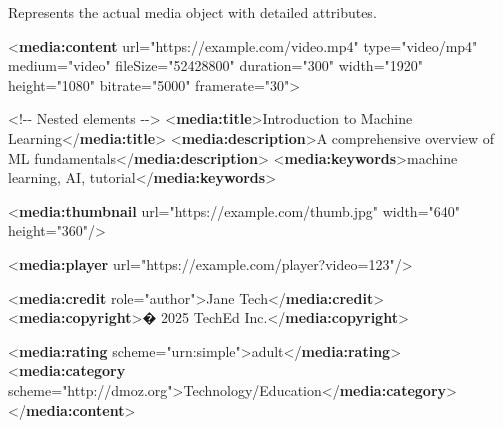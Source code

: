 \documentclass[
  letterpaper,
  DIV=11,
  numbers=noendperiod]{scrartcl}
\newenvironment{Shaded}{\begin{snugshade}}{\end{snugshade}}
\newcommand{\CommentTok}[1]{\textcolor[rgb]{0.37,0.37,0.37}{#1}}
\newcommand{\KeywordTok}[1]{\textcolor[rgb]{0.00,0.23,0.31}{\textbf{#1}}}
\newcommand{\NormalTok}[1]{\textcolor[rgb]{0.00,0.23,0.31}{#1}}
\newcommand{\OtherTok}[1]{\textcolor[rgb]{0.00,0.23,0.31}{#1}}
\newcommand{\StringTok}[1]{\textcolor[rgb]{0.13,0.47,0.30}{#1}}
\begin{document}
Represents the actual media object with detailed attributes.

\begin{Shaded}
\begin{Highlighting}[]
\NormalTok{\textless{}}\KeywordTok{media:content} 
\OtherTok{    url=}\StringTok{"https://example.com/video.mp4"}
\OtherTok{    type=}\StringTok{"video/mp4"}
\OtherTok{    medium=}\StringTok{"video"}
\OtherTok{    fileSize=}\StringTok{"52428800"}
\OtherTok{    duration=}\StringTok{"300"}
\OtherTok{    width=}\StringTok{"1920"}
\OtherTok{    height=}\StringTok{"1080"}
\OtherTok{    bitrate=}\StringTok{"5000"}
\OtherTok{framerate=}\StringTok{"30"}\NormalTok{\textgreater{}}
  
  \CommentTok{\textless{}!{-}{-} Nested elements {-}{-}\textgreater{}}
\NormalTok{  \textless{}}\KeywordTok{media:title}\NormalTok{\textgreater{}Introduction to Machine Learning\textless{}/}\KeywordTok{media:title}\NormalTok{\textgreater{}}
\NormalTok{  \textless{}}\KeywordTok{media:description}\NormalTok{\textgreater{}A comprehensive overview of ML fundamentals\textless{}/}\KeywordTok{media:description}\NormalTok{\textgreater{}}
\NormalTok{  \textless{}}\KeywordTok{media:keywords}\NormalTok{\textgreater{}machine learning, AI, tutorial\textless{}/}\KeywordTok{media:keywords}\NormalTok{\textgreater{}}
  
\NormalTok{  \textless{}}\KeywordTok{media:thumbnail} 
\OtherTok{  url=}\StringTok{"https://example.com/thumb.jpg"} 
\OtherTok{      width=}\StringTok{"640"} 
\OtherTok{      height=}\StringTok{"360"}\NormalTok{/\textgreater{}}
  
\NormalTok{  \textless{}}\KeywordTok{media:player}\OtherTok{ url=}\StringTok{"https://example.com/player?video=123"}\NormalTok{/\textgreater{}}
  
\NormalTok{  \textless{}}\KeywordTok{media:credit}\OtherTok{ role=}\StringTok{"author"}\NormalTok{\textgreater{}Jane Tech\textless{}/}\KeywordTok{media:credit}\NormalTok{\textgreater{}}
\NormalTok{  \textless{}}\KeywordTok{media:copyright}\NormalTok{\textgreater{}� 2025 TechEd Inc.\textless{}/}\KeywordTok{media:copyright}\NormalTok{\textgreater{}}
  
\NormalTok{  \textless{}}\KeywordTok{media:rating}\OtherTok{ scheme=}\StringTok{"urn:simple"}\NormalTok{\textgreater{}adult\textless{}/}\KeywordTok{media:rating}\NormalTok{\textgreater{}}
\NormalTok{  \textless{}}\KeywordTok{media:category}\OtherTok{ scheme=}\StringTok{"http://dmoz.org"}\NormalTok{\textgreater{}Technology/Education\textless{}/}\KeywordTok{media:category}\NormalTok{\textgreater{}}
\NormalTok{\textless{}/}\KeywordTok{media:content}\NormalTok{\textgreater{}}
\end{Highlighting}
\end{Shaded}
\end{document}

